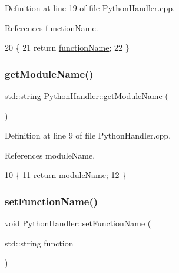 Definition at line 19 of file Python\+Handler.\+cpp.



References function\+Name.


\begin{DoxyCode}
20 \{
21     \textcolor{keywordflow}{return} \hyperlink{class_python_handler_a5946996068756c245e023cfe7e77f034}{functionName};
22 \}
\end{DoxyCode}
\mbox{\label{class_python_handler_acf20183155762af98d1f8804881cddb4}} 
\subsubsection{\texorpdfstring{get\+Module\+Name()}{getModuleName()}}
{\footnotesize\ttfamily std\+::string Python\+Handler\+::get\+Module\+Name (\begin{DoxyParamCaption}{ }\end{DoxyParamCaption})}



Definition at line 9 of file Python\+Handler.\+cpp.



References module\+Name.


\begin{DoxyCode}
10 \{
11     \textcolor{keywordflow}{return} \hyperlink{class_python_handler_ae29ce86e7c2dce2340caa90ba1d6ac72}{moduleName};
12 \}
\end{DoxyCode}
\mbox{\label{class_python_handler_a640d790693c476a5bdd87050c7416ff0}} 
\subsubsection{\texorpdfstring{set\+Function\+Name()}{setFunctionName()}}
{\footnotesize\ttfamily void Python\+Handler\+::set\+Function\+Name (\begin{DoxyParamCaption}\item[{std\+::string}]{function }\end{DoxyParamCaption})}



